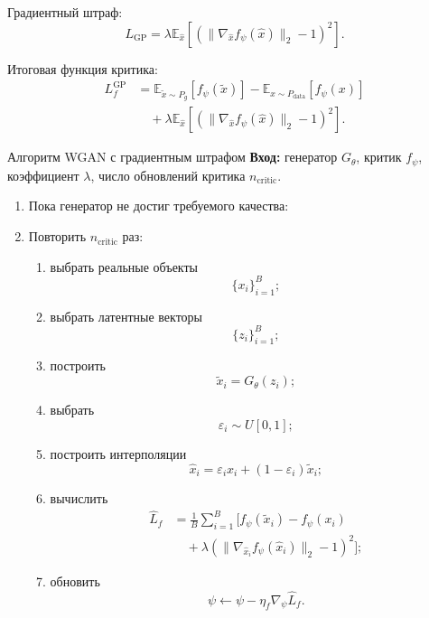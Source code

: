 \documentclass[12pt,a4paper]{article}
\newcommand{\E}{\mathbb{E}}
\numberwithin{equation}{section}
\theoremstyle{definition}
\theoremstyle{remark}
\begin{document}
Градиентный штраф:
\[
    L_{\mathrm{GP}}
    =
    \lambda
    \E_{\widehat{x}}
    \left[
        \left(
            \|\nabla_{\widehat{x}}f_\psi(\widehat{x})\|_2-1
        \right)^2
    \right].
\]

Итоговая функция критика:
\[
\begin{split}
    L_f^{\mathrm{GP}}
    &=
    \E_{\widetilde{x}\sim P_g}[f_\psi(\widetilde{x})]
    -
    \E_{x\sim P_{\mathrm{data}}}[f_\psi(x)]\\
    &\quad+
    \lambda
    \E_{\widehat{x}}
    \left[
        \left(
            \|\nabla_{\widehat{x}}f_\psi(\widehat{x})\|_2-1
        \right)^2
    \right].
\end{split}
\]

\begin{algobox}{Алгоритм WGAN с градиентным штрафом}
\textbf{Вход:} генератор \(G_\theta\), критик \(f_\psi\), коэффициент
\(\lambda\), число обновлений критика \(n_{\mathrm{critic}}\).

\begin{enumerate}
    \item Пока генератор не достиг требуемого качества:

    \item Повторить \(n_{\mathrm{critic}}\) раз:
    \begin{enumerate}
        \item выбрать реальные объекты
        \[
            \{x_i\}_{i=1}^{B};
        \]
        \item выбрать латентные векторы
        \[
            \{z_i\}_{i=1}^{B};
        \]
        \item построить
        \[
            \widetilde{x}_i=G_\theta(z_i);
        \]
        \item выбрать
        \[
            \varepsilon_i\sim U[0,1];
        \]
        \item построить интерполяции
        \[
            \widehat{x}_i
            =
            \varepsilon_i x_i
            +(1-\varepsilon_i)\widetilde{x}_i;
        \]
        \item вычислить
        \[
        \begin{split}
            \widehat{L}_f
            &=
            \frac{1}{B}\sum_{i=1}^{B}
            \biggl[
                f_\psi(\widetilde{x}_i)-f_\psi(x_i)\\
            &\quad+
                \lambda
                \left(
                    \|\nabla_{\widehat{x}_i}
                    f_\psi(\widehat{x}_i)\|_2-1
                \right)^2
            \biggr];
        \end{split}
        \]
        \item обновить
        \[
            \psi
            \leftarrow
            \psi-\eta_f\nabla_\psi\widehat{L}_f.
        \]
    \end{enumerate}


\end{enumerate}
\end{algobox}
\end{document}
